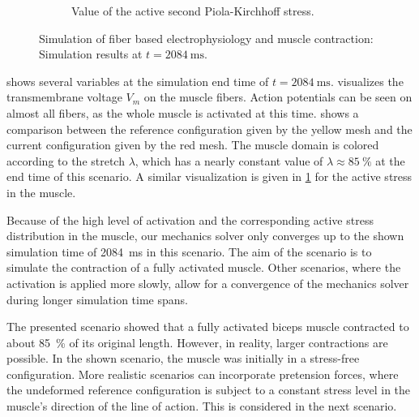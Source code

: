 \begin{figure}
\begin{subfigure}[t]{0.31\textwidth}
    \caption{Value of the active second Piola-Kirchhoff stress.}%
    \label{fig:contraction_active_stress}%
  \end{subfigure}
  \caption{Simulation of fiber based electrophysiology and muscle contraction: Simulation results at $t=\SI{2084}{\ms}$.}%
  \label{fig:contraction_at_end}%
\end{figure}%

 shows several variables at the simulation end time of $t=\SI{2084}{\ms}$.  visualizes the transmembrane voltage $V_m$ on the muscle fibers. Action potentials can be seen on almost all fibers, as the whole muscle is activated at this time.  shows a comparison between the reference configuration given by the yellow mesh and the current configuration given by the red mesh. The muscle domain is colored according to the stretch $\lambda$, which has a nearly constant value of $\lambda \approx \SI{85}{\percent}$ at the end time of this scenario. A similar visualization is given in \cref{fig:contraction_active_stress} for the active stress in the muscle.

Because of the high level of activation and the corresponding active stress distribution in the muscle, our mechanics solver only converges up to the shown simulation time of \SI{2084}{\ms} in this scenario. The aim of the scenario is to simulate the contraction of a fully activated muscle. Other scenarios, where the activation is applied more slowly, allow for a convergence of the mechanics solver during longer simulation time spans.

The presented scenario showed that a fully activated biceps muscle contracted to about \SI{85}{\percent} of its original length. However, in reality, larger contractions are possible. In the shown scenario, the muscle was initially in a stress-free configuration. More realistic scenarios can incorporate pretension forces, where the undeformed reference configuration is subject to a constant stress level in the muscle's direction of the line of action. This is considered in the next scenario.


